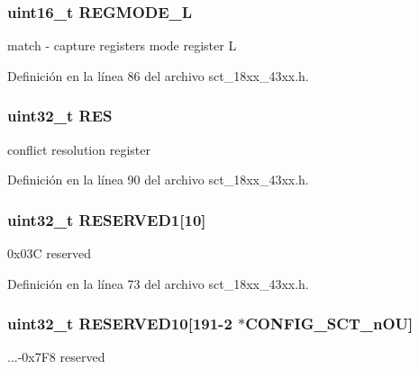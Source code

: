 \subsubsection[{\texorpdfstring{R\+E\+G\+M\+O\+D\+E\+\_\+L}{REGMODE_L}}]{ uint16\+\_\+t R\+E\+G\+M\+O\+D\+E\+\_\+L}\hypertarget{struct_l_p_c___s_c_t___t_ae32e76f90545705ff498e9a649235eff}{}\label{struct_l_p_c___s_c_t___t_ae32e76f90545705ff498e9a649235eff}
match -\/ capture registers mode register L 

Definición en la línea 86 del archivo sct\+\_\+18xx\+\_\+43xx.\+h.

\subsubsection[{\texorpdfstring{R\+ES}{RES}}]{ uint32\+\_\+t R\+ES}\hypertarget{struct_l_p_c___s_c_t___t_ac214badf320ceabb8dc3c067c4aeaf9f}{}\label{struct_l_p_c___s_c_t___t_ac214badf320ceabb8dc3c067c4aeaf9f}
conflict resolution register 

Definición en la línea 90 del archivo sct\+\_\+18xx\+\_\+43xx.\+h.

\subsubsection[{\texorpdfstring{R\+E\+S\+E\+R\+V\+E\+D1}{RESERVED1}}]{\setlength{\rightskip}{0pt plus 5cm}uint32\+\_\+t R\+E\+S\+E\+R\+V\+E\+D1\mbox{[}10\mbox{]}}\hypertarget{struct_l_p_c___s_c_t___t_ad51cbe7192ea13182e4fde3ff412e3f2}{}\label{struct_l_p_c___s_c_t___t_ad51cbe7192ea13182e4fde3ff412e3f2}
0x03C reserved 

Definición en la línea 73 del archivo sct\+\_\+18xx\+\_\+43xx.\+h.

\subsubsection[{\texorpdfstring{R\+E\+S\+E\+R\+V\+E\+D10}{RESERVED10}}]{\setlength{\rightskip}{0pt plus 5cm}uint32\+\_\+t R\+E\+S\+E\+R\+V\+E\+D10\mbox{[}191-\/2 $\ast${\bf C\+O\+N\+F\+I\+G\+\_\+\+S\+C\+T\+\_\+n\+OU}\mbox{]}}\hypertarget{struct_l_p_c___s_c_t___t_a4be0af0057feabb08d798793765e5e93}{}\label{struct_l_p_c___s_c_t___t_a4be0af0057feabb08d798793765e5e93}
...-\/0x7\+F8 reserved 

